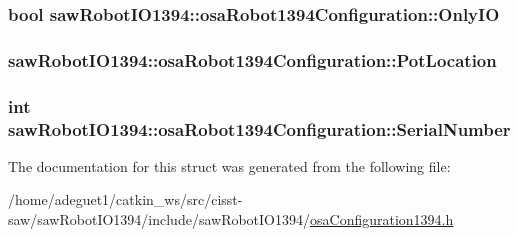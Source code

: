\hypertarget{structsaw_robot_i_o1394_1_1osa_robot1394_configuration_adb157eac1f41c7fa79e17acce239cfad}{
\subsubsection[{Only\-I\-O}]{\setlength{\rightskip}{0pt plus 5cm}bool saw\-Robot\-I\-O1394\-::osa\-Robot1394\-Configuration\-::\-Only\-I\-O}}\label{structsaw_robot_i_o1394_1_1osa_robot1394_configuration_adb157eac1f41c7fa79e17acce239cfad}
\hypertarget{structsaw_robot_i_o1394_1_1osa_robot1394_configuration_a5b38595afbffebafba80e01c0bea9bac}{
\subsubsection[{Pot\-Location}]{ saw\-Robot\-I\-O1394\-::osa\-Robot1394\-Configuration\-::\-Pot\-Location}}\label{structsaw_robot_i_o1394_1_1osa_robot1394_configuration_a5b38595afbffebafba80e01c0bea9bac}
\hypertarget{structsaw_robot_i_o1394_1_1osa_robot1394_configuration_ac794d131a11c2e3dc453f5f753e564d3}{
\subsubsection[{Serial\-Number}]{\setlength{\rightskip}{0pt plus 5cm}int saw\-Robot\-I\-O1394\-::osa\-Robot1394\-Configuration\-::\-Serial\-Number}}\label{structsaw_robot_i_o1394_1_1osa_robot1394_configuration_ac794d131a11c2e3dc453f5f753e564d3}


The documentation for this struct was generated from the following file\-:\begin{DoxyCompactItemize}
\item 
/home/adeguet1/catkin\-\_\-ws/src/cisst-\/saw/saw\-Robot\-I\-O1394/include/saw\-Robot\-I\-O1394/\hyperlink{osa_configuration1394_8h}{osa\-Configuration1394.\-h}\end{DoxyCompactItemize}

